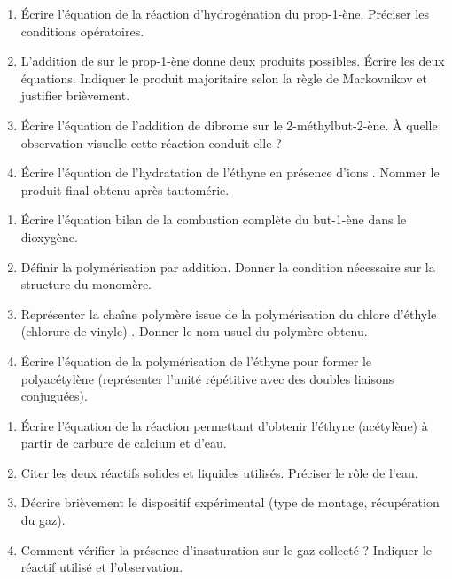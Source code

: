 \documentclass[11pt]{article}
\begin{document}
\begin{exercice}
\begin{enumerate}
    \item Écrire l'équation de la réaction d'hydrogénation du prop-1-ène. Préciser les conditions opératoires.
    \item L'addition de  sur le prop-1-ène donne deux produits possibles. Écrire les deux équations. Indiquer le produit majoritaire selon la règle de Markovnikov et justifier brièvement.
    \item Écrire l'équation de l'addition de dibrome  sur le 2-méthylbut-2-ène. À quelle observation visuelle cette réaction conduit-elle ?
    \item Écrire l'équation de l'hydratation de l'éthyne en présence d'ions . Nommer le produit final obtenu après tautomérie.
\end{enumerate}
\end{exercice}

\begin{exercice}
\begin{enumerate}
    \item Écrire l'équation bilan de la combustion complète du but-1-ène  dans le dioxygène.
    \item Définir la polymérisation par addition. Donner la condition nécessaire sur la structure du monomère.
    \item Représenter la chaîne polymère issue de la polymérisation du chlore d'éthyle (chlorure de vinyle) . Donner le nom usuel du polymère obtenu.
    \item Écrire l'équation de la polymérisation de l'éthyne pour former le polyacétylène (représenter l'unité répétitive avec des doubles liaisons conjuguées).
\end{enumerate}
\end{exercice}

\begin{exercice}
\begin{enumerate}
    \item Écrire l'équation de la réaction permettant d'obtenir l'éthyne (acétylène) à partir de carbure de calcium  et d'eau.
    \item Citer les deux réactifs solides et liquides utilisés. Préciser le rôle de l'eau.
    \item Décrire brièvement le dispositif expérimental (type de montage, récupération du gaz).
    \item Comment vérifier la présence d'insaturation sur le gaz collecté ? Indiquer le réactif utilisé et l'observation.
\end{enumerate}
\end{exercice}
\end{document}
